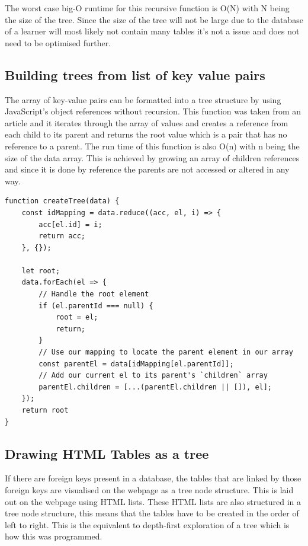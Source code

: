 The worst case big-O runtime for this recursive function is O(N) with N being the size of the tree. Since the size of the tree will not be large due to the database of a learner will most likely not contain many tables it's not a issue and does not need to be optimised further.

\subsection{Building trees from list of key value pairs}

The array of key-value pairs can be formatted into a tree structure by using JavaScript's object references without recursion.  This function was taken from an article \cite{reference} and it iterates through the array of values and creates a reference from each child to its parent and returns the root value which is a pair that has no reference to a parent. The run time of this function is also O(n) with n being the size of the data array. This is achieved by growing an array of children references and since it is done by reference the parents are not accessed or altered in any way.

\begin{lstlisting}[style=JavaScript, caption={JavaScript function to build a tree from a list of key value pairs.}]
function createTree(data) {
	const idMapping = data.reduce((acc, el, i) => {
		acc[el.id] = i;
		return acc;
	}, {});
	
	let root;
	data.forEach(el => {
		// Handle the root element
		if (el.parentId === null) {
			root = el;
			return;
		}
		// Use our mapping to locate the parent element in our array
		const parentEl = data[idMapping[el.parentId]];
		// Add our current el to its parent's `children` array
		parentEl.children = [...(parentEl.children || []), el];
	});
	return root
}
\end{lstlisting}

\subsection{Drawing HTML Tables as a tree}

If there are foreign keys present in a database, the tables that are linked by those foreign keys are visualised on the webpage as a tree node structure. This is laid out on the webpage using HTML lists. These HTML lists are also structured in a tree node structure, this means that the tables have to be created in the order of left to right. This is the equivalent to depth-first exploration of a tree which is how this was programmed. 


